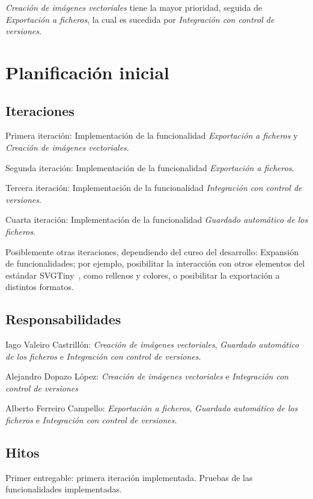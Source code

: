 \documentclass[a4paper,openright,12pt]{article}
\begin{document}
\emph{Creación de imágenes vectoriales} tiene la mayor prioridad, seguida de \emph{Exportación a ficheros}, la cual es sucedida por \emph{Integración con control de versiones}.

\section{Planificación inicial}

\subsection{Iteraciones}\label{iteraciones}
Primera iteración: Implementación de la funcionalidad \emph{Exportación a ficheros} y \emph{Creación de imágenes vectoriales}.

Segunda iteración: Implementación de la funcionalidad \emph{Exportación a ficheros}.

Tercera iteración: Implementación de la funcionalidad \emph{Integración con control de versiones}.

Cuarta iteración: Implementación de la funcionalidad \emph{Guardado automático de los ficheros}.

Posiblemente otras iteraciones, dependiendo del curso del desarrollo: Expansión de funcionalidades; por ejemplo, posibilitar la interacción con otros elementos del estándar SVGTiny~\cite{SVGTiny}, como rellenos y colores, o posibilitar la exportación a distintos formatos.


\subsection{Responsabilidades}
Iago Valeiro Castrillón: 
\emph{Creación de imágenes vectoriales}, 
\emph{Guardado automático de los ficheros} e 
\emph{Integración con control de versiones}.

Alejandro Dopazo López:
\emph{Creación de imágenes vectoriales} e
\emph{Integración con control de versiones}

Alberto Ferreiro Campello:
\emph{Exportación a ficheros}, 
\emph{Guardado automático de los ficheros} e
\emph{Integración con control de versiones}.


\subsection{Hitos}
Primer entregable: primera iteración implementada. Pruebas de las funcionalidades implementadas.
\end{document}
